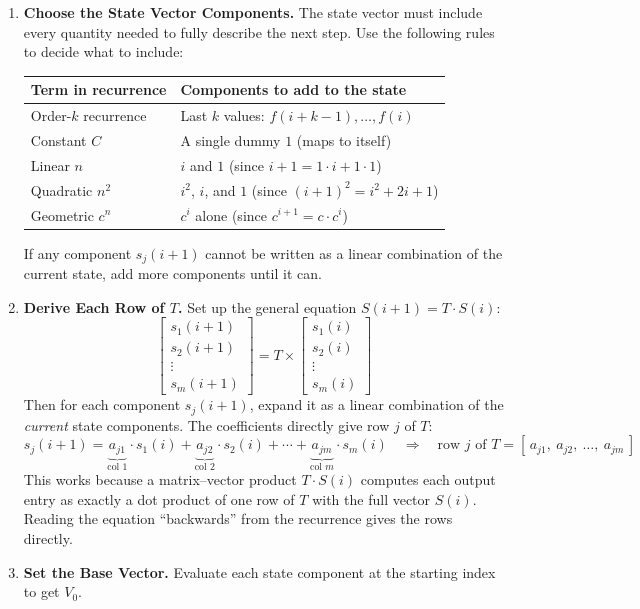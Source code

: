 \documentclass[11pt]{article}
\begin{document}
\begin{enumerate}
    \item \textbf{Choose the State Vector Components.} The state vector must include every quantity needed to fully describe the next step. Use the following rules to decide what to include:
    \begin{center}
    \begin{tabular}{ll}
    \toprule
    \textbf{Term in recurrence} & \textbf{Components to add to the state} \\
    \midrule
    Order-$k$ recurrence & Last $k$ values: $f(i+k-1), \dots, f(i)$ \\
    Constant $C$ & A single dummy $1$ (maps to itself) \\
    Linear $n$ & $i$ and $1$ \quad (since $i+1 = 1 \cdot i + 1 \cdot 1$) \\
    Quadratic $n^2$ & $i^2$, $i$, and $1$ \quad (since $(i+1)^2 = i^2 + 2i + 1$) \\
    Geometric $c^n$ & $c^i$ alone \quad (since $c^{i+1} = c \cdot c^i$) \\
    \bottomrule
    \end{tabular}
    \end{center}
    If any component $s_j(i+1)$ cannot be written as a linear combination of the current state, add more components until it can.

    \item \textbf{Derive Each Row of $T$.} Set up the general equation $S(i+1) = T \cdot S(i)$:
    \[
    \begin{bmatrix} s_1(i+1) \\ s_2(i+1) \\ \vdots \\ s_m(i+1) \end{bmatrix}
    = T \times
    \begin{bmatrix} s_1(i) \\ s_2(i) \\ \vdots \\ s_m(i) \end{bmatrix}
    \]
    Then for each component $s_j(i+1)$, expand it as a linear combination of the \textit{current} state components. The coefficients directly give row $j$ of $T$:
    \[
        s_j(i+1) = \underbrace{a_{j1}}_{\text{col 1}} \cdot s_1(i)
                 + \underbrace{a_{j2}}_{\text{col 2}} \cdot s_2(i)
                 + \cdots
                 + \underbrace{a_{jm}}_{\text{col } m} \cdot s_m(i)
        \quad\Rightarrow\quad
        \text{row } j \text{ of } T = [\,a_{j1},\ a_{j2},\ \dots,\ a_{jm}\,]
    \]
    This works because a matrix--vector product $T \cdot S(i)$ computes each output entry as exactly a dot product of one row of $T$ with the full vector $S(i)$. Reading the equation ``backwards'' from the recurrence gives the rows directly.

    \item \textbf{Set the Base Vector.} Evaluate each state component at the starting index to get $V_0$.
\end{enumerate}
\end{document}
